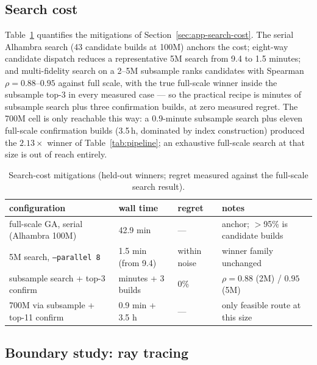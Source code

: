 

\subsection{Search cost}
\label{sec:eval-search-cost}

Table~\ref{tab:searchcost} quantifies the mitigations of Section~\ref{sec:app-search-cost}. The serial Alhambra search (43 candidate builds at 100M) anchors the cost; eight-way candidate dispatch reduces a representative 5M search from 9.4 to 1.5 minutes; and multi-fidelity search on a 2--5M subsample ranks candidates with Spearman $\rho = 0.88$--$0.95$ against full scale, with the true full-scale winner inside the subsample top-3 in every measured case --- so the practical recipe is minutes of subsample search plus three confirmation builds, at zero measured regret. The 700M cell is only reachable this way: a 0.9-minute subsample search plus eleven full-scale confirmation builds (3.5\,h, dominated by index construction) produced the $2.13\times$ winner of Table~\ref{tab:pipeline}; an exhaustive full-scale search at that size is out of reach entirely.

\begin{table}[t]
  \centering
  \caption{Search-cost mitigations (held-out winners; regret measured against the full-scale search result).}
  \label{tab:searchcost}
  \small
  \begin{tabular}{llll}
    \toprule
    configuration & wall time & regret & notes \\
    \midrule
    full-scale GA, serial (Alhambra 100M)   & 42.9 min & --- & anchor; $>$95\% is candidate builds \\
    5M search, \texttt{--parallel 8}        & 1.5 min (from 9.4) & within noise & winner family unchanged \\
    subsample search + top-3 confirm        & minutes + 3 builds & 0\% & $\rho=0.88$ (2M) / $0.95$ (5M) \\
    700M via subsample + top-11 confirm     & 0.9 min + 3.5 h & --- & only feasible route at this size \\
    \bottomrule
  \end{tabular}
\end{table}

\subsection{Boundary study: ray tracing}
\label{sec:eval-boundary}

